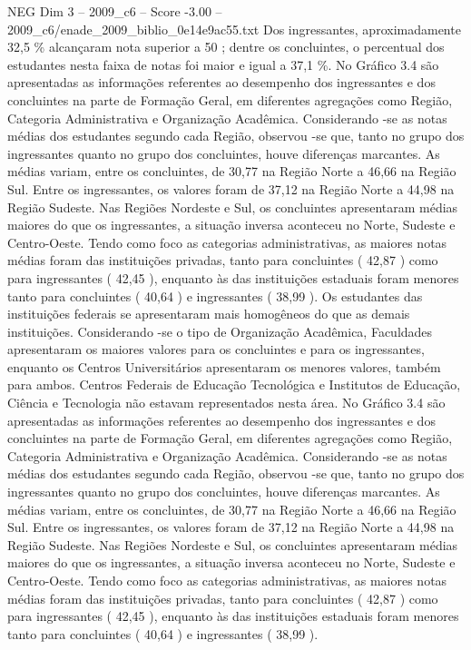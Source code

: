 \begin{textsample}{NEG Dim 3 – 2009\_c6 – Score -3.00 – 2009\_c6/enade\_2009\_biblio\_0e14e9ac55.txt}
Dos ingressantes, aproximadamente 32,5 \% alcançaram nota superior a 50 ; dentre os concluintes, o percentual dos estudantes nesta faixa de notas foi maior e igual a 37,1 \%.
No Gráfico 3.4 são apresentadas as informações referentes ao desempenho dos ingressantes e dos concluintes na parte de Formação Geral, em diferentes agregações como Região, Categoria Administrativa e Organização Acadêmica.
Considerando -se as notas médias dos estudantes segundo cada Região, observou -se que, tanto no grupo dos ingressantes quanto no grupo dos concluintes, houve diferenças marcantes.
As médias variam, entre os concluintes, de 30,77 na Região Norte a 46,66 na Região Sul.
Entre os ingressantes, os valores foram de 37,12 na Região Norte a 44,98 na Região Sudeste.
Nas Regiões Nordeste e Sul, os concluintes apresentaram médias maiores do que os ingressantes, a situação inversa aconteceu no Norte, Sudeste e Centro-Oeste.
Tendo como foco as categorias administrativas, as maiores notas médias foram das instituições privadas, tanto para concluintes ( 42,87 ) como para ingressantes ( 42,45 ), enquanto às das instituições estaduais foram menores tanto para concluintes ( 40,64 ) e ingressantes ( 38,99 ).
Os estudantes das instituições federais se apresentaram mais homogêneos do que as demais instituições.
Considerando -se o tipo de Organização Acadêmica, Faculdades apresentaram os maiores valores para os concluintes e para os ingressantes, enquanto os Centros Universitários apresentaram os menores valores, também para ambos.
Centros Federais de Educação Tecnológica e Institutos de Educação, Ciência e Tecnologia não estavam representados nesta área.
No Gráfico 3.4 são apresentadas as informações referentes ao desempenho dos ingressantes e dos concluintes na parte de Formação Geral, em diferentes agregações como Região, Categoria Administrativa e Organização Acadêmica.
Considerando -se as notas médias dos estudantes segundo cada Região, observou -se que, tanto no grupo dos ingressantes quanto no grupo dos concluintes, houve diferenças marcantes.
As médias variam, entre os concluintes, de 30,77 na Região Norte a 46,66 na Região Sul.
Entre os ingressantes, os valores foram de 37,12 na Região Norte a 44,98 na Região Sudeste.
Nas Regiões Nordeste e Sul, os concluintes apresentaram médias maiores do que os ingressantes, a situação inversa aconteceu no Norte, Sudeste e Centro-Oeste.
Tendo como foco as categorias administrativas, as maiores notas médias foram das instituições privadas, tanto para concluintes ( 42,87 ) como para ingressantes ( 42,45 ), enquanto às das instituições estaduais foram menores tanto para concluintes ( 40,64 ) e ingressantes ( 38,99 ).

\end{textsample}
